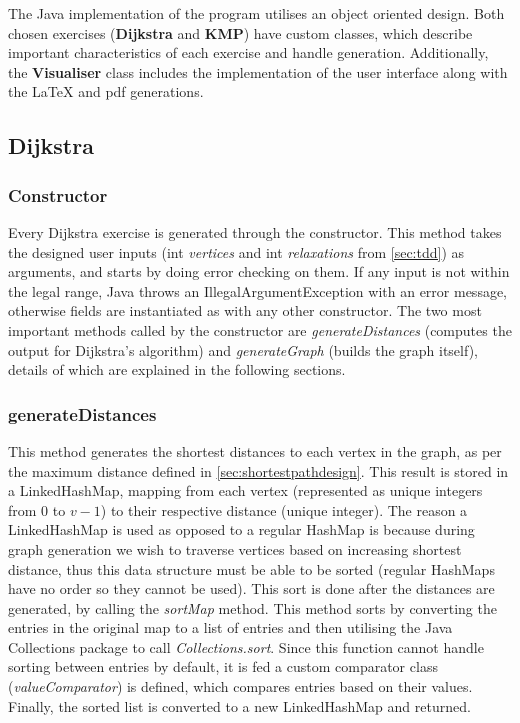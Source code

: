 \documentclass{l4proj}
\begin{document}
The Java implementation of the program utilises an object oriented design. Both chosen exercises (\textbf{Dijkstra} and \textbf{KMP}) have custom classes, which describe important characteristics of each exercise and handle generation. Additionally, the \textbf{Visualiser} class includes the implementation of the user interface along with the LaTeX and pdf generations.

\subsection{Dijkstra}

\subsubsection{Constructor}

Every Dijkstra exercise is generated through the constructor. This method takes the designed user inputs (int \emph{vertices} and int \emph{relaxations} from \autoref{sec:tdd}) as arguments, and  starts by doing error checking on them. If any input is not within the legal range, Java throws an IllegalArgumentException with an error message, otherwise fields are instantiated as with any other constructor. The two most important methods called by the constructor are \emph{generateDistances} (computes the output for Dijkstra's algorithm) and \emph{generateGraph} (builds the graph itself), details of which are explained in the following sections.

\subsubsection{generateDistances}

This method generates the shortest distances to each vertex in the graph, as per the maximum distance defined in \autoref{sec:shortestpathdesign}. This result is stored in a LinkedHashMap, mapping from each vertex (represented as unique integers from $0$ to $v-1$) to their respective distance (unique integer). The reason a LinkedHashMap is used as opposed to a regular HashMap is because during graph generation we wish to traverse vertices based on increasing shortest distance, thus this data structure must be able to be sorted (regular HashMaps have no order so they cannot be used). This sort is done after the distances are generated, by calling the \emph{sortMap} method. This method sorts by converting the entries in the original map to a list of entries and then utilising the Java Collections package to call \emph{Collections.sort}. Since this function cannot handle sorting between entries by default, it is fed a custom comparator class (\emph{valueComparator}) is defined, which compares entries based on their values. Finally, the sorted list is converted to a new LinkedHashMap and returned.
\end{document}
